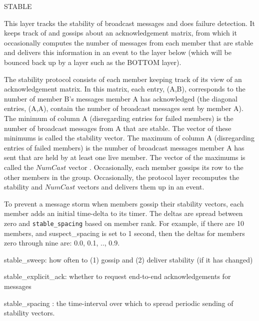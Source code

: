 %
%
%
\begin{Layer}{STABLE}

This layer tracks the stability of broadcast messages and does
failure detection.  It keeps track of and gossips about an
acknowledgement matrix, from which it occasionally computes the
number of messages from each member that are stable and delivers this
information in an  event to the layer below (which will be
bounced back up by a layer such as the BOTTOM layer).

\begin{Protocol}
The stability protocol consists of each member keeping track of its
view of an acknowledgement matrix.  In this matrix, each entry,
(A,B), corresponds to the number of member B's messages member A has
acknowledged (the diagonal entries, (A,A), contain the number of
broadcast messages sent by member A).  The minimum of column A
(disregarding entries for failed members) is the number of broadcast
messages from A that are stable.  The vector of these minimums is
called the stability vector.  The maximum of column A (disregarding
entries of failed members) is the number of broadcast messages member
A has sent that are held by at least one live member.  The vector of
the maximums is called the $NumCast$ vector .  Occasionally, each member gossips its row to the
other members in the group.  Occasionally, the protocol layer
recomputes the stability and $NumCast$ vectors and delivers them up
in an  event.

To prevent a message storm when members gossip their stability
vectors, each member adds an initial time-delta to its timer. The
deltas are spread between zero and {\tt stable\_spacing} based on
member rank.  For example, if there are 10 members, and
suspect\_spacing is set to 1 second, then the deltas for members zero
through nine are: 0.0, 0.1, .., 0.9. 
\end{Protocol}

\begin{Parameters}
\item 
stable\_sweep: how often to (1) gossip and (2) deliver stability (if
it has changed)
\item 
stable\_explicit\_ack: whether to request end-to-end acknowledgements
for messages
\item
stable\_spacing : the time-interval over which to spread periodic
sending of stability vectors.
\end{Parameters}


\end{Layer}
